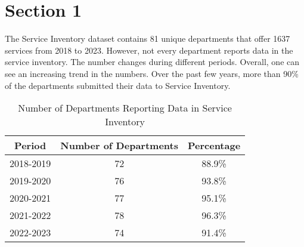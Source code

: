 \section{Section 1}

The Service Inventory dataset contains 81 unique departments that offer 1637 services from 2018 to 2023. However, not every department reports data in the service inventory. The number changes during different periods. Overall, one can see an increasing trend in the numbers. Over the past few years, more than 90\% of the departments submitted their data to Service Inventory.

\begin{table}
    \centering
    \begin{tabular}{|c|c|c|}
    \hline
    Period & Number of Departments & Percentage \\ \hline
    2018-2019 & 72 & 88.9\% \\ \hline
    2019-2020 & 76 & 93.8\% \\ \hline
    2020-2021 & 77 & 95.1\% \\ \hline
    2021-2022 & 78 & 96.3\% \\ \hline
    2022-2023 & 74 & 91.4\% \\ \hline
    \end{tabular}
    \caption{Number of Departments Reporting Data in Service Inventory}
    \end{table}
